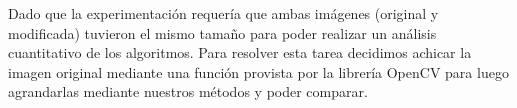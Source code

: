 
Dado que la experimentación requería que ambas imágenes (original y modificada) tuvieron el mismo tamaño para poder realizar un análisis cuantitativo de los algoritmos. Para resolver esta tarea decidimos achicar la imagen original mediante una función provista por la librería OpenCV para luego agrandarlas mediante nuestros métodos y poder comparar.